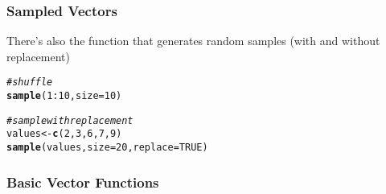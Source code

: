 \documentclass[12pt]{beamer}\usepackage[]{graphicx}\usepackage[]{color}
\makeatletter
\newcommand{\hlnum}[1]{\textcolor[rgb]{0.686,0.059,0.569}{#1}}%
\newcommand{\hlcom}[1]{\textcolor[rgb]{0.678,0.584,0.686}{\textit{#1}}}%
\newcommand{\hlopt}[1]{\textcolor[rgb]{0,0,0}{#1}}%
\newcommand{\hlstd}[1]{\textcolor[rgb]{0.345,0.345,0.345}{#1}}%
\newcommand{\hlkwb}[1]{\textcolor[rgb]{0.69,0.353,0.396}{#1}}%
\newcommand{\hlkwc}[1]{\textcolor[rgb]{0.333,0.667,0.333}{#1}}%
\newcommand{\hlkwd}[1]{\textcolor[rgb]{0.737,0.353,0.396}{\textbf{#1}}}%
\newenvironment{kframe}{%
 \def\at@end@of@kframe{}%
 \ifinner\ifhmode%
  \def\at@end@of@kframe{\end{minipage}}%
  \begin{minipage}{\columnwidth}%
 \fi\fi%
 \def\FrameCommand##1{\hskip\@totalleftmargin \hskip-\fboxsep
 \colorbox{shadecolor}{##1}\hskip-\fboxsep
     \hskip-\linewidth \hskip-\@totalleftmargin \hskip\columnwidth}%
 \MakeFramed {\advance\hsize-\width
   \@totalleftmargin\z@ \linewidth\hsize
   \@setminipage}}%
 {\par\unskip\endMakeFramed%
 \at@end@of@kframe}
\newenvironment{knitrout}{}{} %
\makeatother
\begin{document}

\begin{frame}[fragile]
\frametitle{Sampled Vectors}

There's also the function  that generates random samples (with and without replacement)
\begin{knitrout}\footnotesize
{}\color{fgcolor}\begin{kframe}
\begin{alltt}
\hlcom{# shuffle}
\hlkwd{sample}\hlstd{(}\hlnum{1}\hlopt{:}\hlnum{10}\hlstd{,} \hlkwc{size} \hlstd{=} \hlnum{10}\hlstd{)}

\hlcom{# sample with replacement}
\hlstd{values} \hlkwb{<-} \hlkwd{c}\hlstd{(}\hlnum{2}\hlstd{,} \hlnum{3}\hlstd{,} \hlnum{6}\hlstd{,} \hlnum{7}\hlstd{,} \hlnum{9}\hlstd{)}
\hlkwd{sample}\hlstd{(values,} \hlkwc{size} \hlstd{=} \hlnum{20}\hlstd{,} \hlkwc{replace} \hlstd{=} \hlnum{TRUE}\hlstd{)}
\end{alltt}
\end{kframe}
\end{knitrout}

\end{frame}


\begin{frame}
\begin{center}
\Huge{}
\end{center}
\end{frame}


\begin{frame}[fragile]
\frametitle{Basic Vector Functions}

\bi
  \item {}
  \item {}
  \item {}
  \item {}
  \item {}
  \item {}
\ei

\end{frame}

\end{document}
